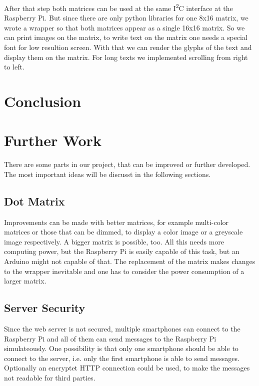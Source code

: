 \documentclass[conference]{IEEEtran}
\begin{document}
After that step both matrices can be used at the same I\textsuperscript{2}C interface at the Raspberry Pi. But since there are only python libraries for one 8x16 matrix, we wrote a wrapper so that both matrices appear as a single 16x16 matrix. So we can print images on the matrix, to write text on the matrix one needs a special font for low resultion screen. With that we can render the glyphs of the text and display them on the matrix. For long texts we implemented scrolling from right to left.


\section{Conclusion}



\section{Further Work}
There are some parts in our project, that can be improved or further developed. The most important ideas will be discusst in the following sections.

\subsection{Dot Matrix}
Improvements can be made with better matrices, for example multi-color matrices or those that can be dimmed, to display a color image or a greyscale image respectively. A bigger matrix is possible, too. All this needs more computing power, but the Raspberry Pi is easily capable of this task, but an Arduino might not capable of that. The replacement of the matrix makes changes to the wrapper inevitable and one has to consider the power consumption of a larger matrix.

\subsection{Server Security}
Since the web server is not secured, multiple smartphones can connect to the Raspberry Pi and all of them can send messages to the Raspberry Pi simulateously. One possibility is that only one smartphone should be able to connect to the server, i.e. only the first smartphone is able to send messages. Optionally an encryptet HTTP connection could be used, to make the messages not readable for third parties.
\end{document}
